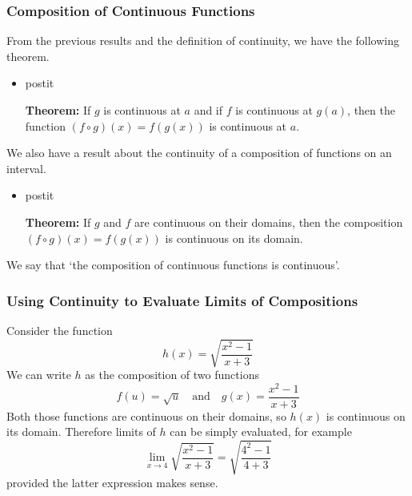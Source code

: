 \documentclass[serif,ignorenonframetext]{beamer}
\begin{document}
\begin{frame}
  \frametitle{Composition of Continuous Functions}
  From the previous results and the definition of
  continuity, we have the following theorem.

  \begin{itemize}
  \item[]
  \begin{beamercolorbox}{postit}

    \textbf{Theorem:} If $g$ is continuous at $a$ and if $f$ is continuous
    at $g(a)$, then the function
    $(f\circ g)(x) = f(g(x))$ is continuous at $a$.

  \end{beamercolorbox}
  \end{itemize}

  \pause

  We also have a result about the continuity of a composition of functions on
  an interval.

  \begin{itemize}
  \item[]
  \begin{beamercolorbox}{postit}
    
    \textbf{Theorem:} If $g$ and $f$ are continuous on their domains,
    then the composition $(f\circ g)(x)=f(g(x))$ is continuous on its
    domain.

  \end{beamercolorbox}
  \end{itemize}

  \pause

  We say that `the composition of continuous functions is continuous'.
\end{frame}

\begin{frame}
  \frametitle{Using Continuity to Evaluate Limits of Compositions}
  Consider the function 
  \begin{displaymath}
    h(x) = \sqrt{\frac{x^2-1}{x+3}}
  \end{displaymath}
  \pause
  We can write $h$ as the composition of two functions
  \begin{displaymath}
    f(u) = \sqrt{u} \quad\mbox{and}\quad g(x)=\frac{x^2-1}{x+3}
  \end{displaymath}
  \pause
  Both those functions are continuous on their domains,
  so $h(x)$ is continuous on its domain.  
  \pause
  Therefore limits of $h$ can be simply evaluated, for example
  \begin{displaymath}
    \lim_{x\to 4} \sqrt{\frac{x^2-1}{x+3}} = \sqrt{\frac{4^2-1}{4+3}}
  \end{displaymath}
  provided the latter expression makes sense.
\end{frame}
\end{document}
